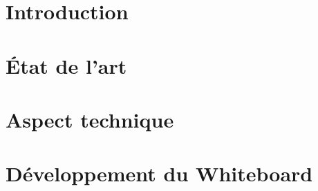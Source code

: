 \documentclass[
    iict, %
    iscl, %
]{heig-tb}
\begin{document}
\maketitle
\frontmatter
\clearemptydoublepage

\preamble
\authentification

%   

\begin{requirements}
  
\end{requirements}

\clearemptydoublepage
{
  \tableofcontents
}

\printnomenclature
\clearemptydoublepage
{}

\mainmatter
\chapter{Introduction}


\chapter{État de l'art}


\chapter{Aspect technique}


\chapter{Développement du Whiteboard}


%

\clearpage
\printbibliography

\addappheadtotoc



\let\cleardoublepage\clearpage
\backmatter

\label{glossaire}
\printnoidxglossary
\label{index}
\printindex

%
\end{document}
